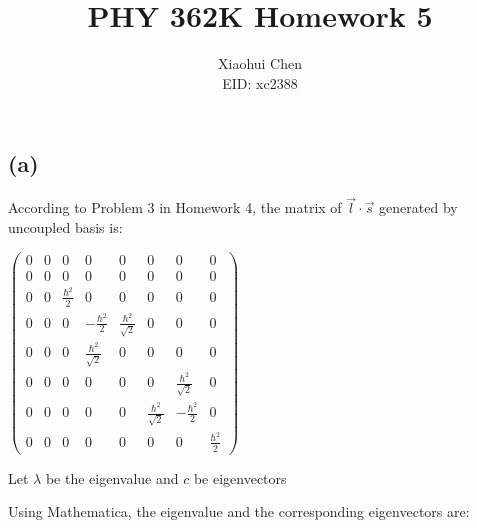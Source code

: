\documentclass[12pt]{article}
\author{Xiaohui Chen \\EID: xc2388}
\title{PHY 362K Homework 5}
\begin{document}
\maketitle

\begin{spacing}{2.0}


\section{} %

\subsection*{(a)}

According to Problem 3 in Homework 4, the matrix of $\vec{l} \cdot \vec{s}$ generated by uncoupled basis is:

$\left(
\begin{array}{cccccccc}
0 & 0 & 0 & 0 & 0 & 0 & 0 & 0 \\
0 & 0 & 0 & 0 & 0 & 0 & 0 & 0 \\
0 & 0 & \frac{\hbar^2}{2} & 0 & 0 & 0 & 0 & 0 \\
0 & 0 & 0 & -\frac{\hbar^2}{2} & \frac{\hbar^2}{\sqrt{2}} & 0 & 0 & 0 \\
0 & 0 & 0 & \frac{\hbar^2}{\sqrt{2}} & 0 & 0 & 0 & 0 \\
0 & 0 & 0 & 0 & 0 & 0 & \frac{\hbar^2}{\sqrt{2}} & 0 \\
0 & 0 & 0 & 0 & 0 & \frac{\hbar^2}{\sqrt{2}} & -\frac{\hbar^2}{2} & 0 \\
0 & 0 & 0 & 0 & 0 & 0 & 0 & \frac{\hbar^2}{2}
\end{array}
\right)
$

Let $\lambda$ be the eigenvalue and $c$ be eigenvectors

Using Mathematica, the eigenvalue and the corresponding eigenvectors are:

\end{spacing}
\end{document}
